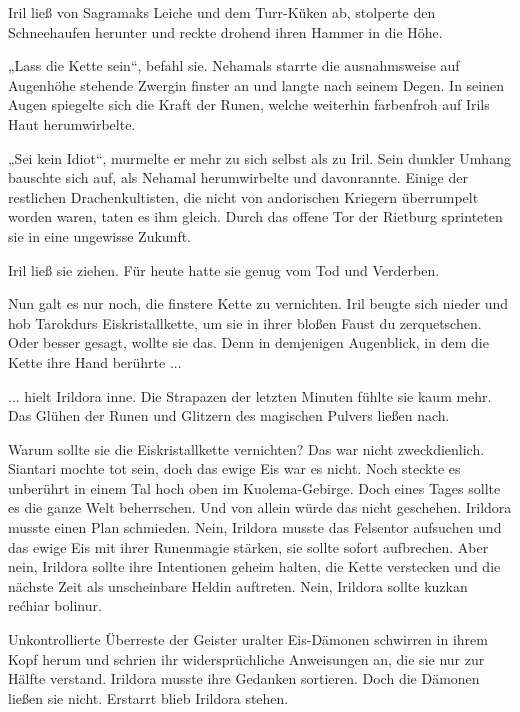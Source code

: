 Iril ließ von Sagramaks Leiche und dem Turr-Küken ab, stolperte den Schneehaufen herunter und reckte drohend ihren Hammer in die Höhe.

„Lass die Kette sein“, befahl sie. Nehamals starrte die ausnahmsweise auf Augenhöhe stehende Zwergin finster an und langte nach seinem Degen. In seinen Augen spiegelte sich die Kraft der Runen, welche weiterhin farbenfroh auf Irils Haut herumwirbelte.

„Sei kein Idiot“, murmelte er mehr zu sich selbst als zu Iril. Sein dunkler Umhang bauschte sich auf, als Nehamal herumwirbelte und davonrannte. Einige der restlichen Drachenkultisten, die nicht von andorischen Kriegern überrumpelt worden waren, taten es ihm gleich. Durch das offene Tor der Rietburg sprinteten sie in eine ungewisse Zukunft.

Iril ließ sie ziehen. Für heute hatte sie genug vom Tod und Verderben.

Nun galt es nur noch, die finstere Kette zu vernichten. Iril beugte sich nieder und hob Tarokdurs Eiskristallkette, um sie in ihrer bloßen Faust du zerquetschen. Oder besser gesagt, wollte sie das. Denn in demjenigen Augenblick, in dem die Kette ihre Hand berührte ...



\trennzeichen



... hielt Irildora inne. Die Strapazen der letzten Minuten fühlte sie kaum mehr. Das Glühen der Runen und Glitzern des magischen Pulvers ließen nach.

Warum sollte sie die Eiskristallkette vernichten? Das war nicht zweckdienlich. Siantari mochte tot sein, doch das ewige Eis war es nicht. Noch steckte es unberührt in einem Tal hoch oben im Kuolema-Gebirge. Doch eines Tages sollte es die ganze Welt beherrschen. Und von allein würde das nicht geschehen. Irildora musste einen Plan schmieden. Nein, Irildora musste das Felsentor aufsuchen und das ewige Eis mit ihrer Runenmagie stärken, sie sollte sofort aufbrechen. Aber nein, Irildora sollte ihre Intentionen geheim halten, die Kette verstecken und die nächste Zeit als unscheinbare Heldin auftreten. Nein, Irildora sollte kuzkan rećhiar bolinur.

Unkontrollierte Überreste der Geister uralter Eis-Dämonen schwirren in ihrem Kopf herum und schrien ihr widersprüchliche Anweisungen an, die sie nur zur Hälfte verstand. Irildora musste ihre Gedanken sortieren. Doch die Dämonen ließen sie nicht. Erstarrt blieb Irildora stehen.



